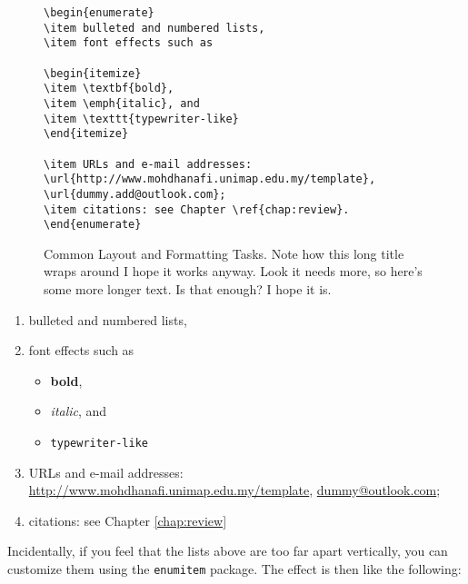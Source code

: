 
\begin{figure}[htb!]
\begin{lstlisting}
\begin{enumerate}
\item bulleted and numbered lists, 
\item font effects such as

\begin{itemize}
\item \textbf{bold}, 
\item \emph{italic}, and 
\item \texttt{typewriter-like}
\end{itemize}

\item URLs and e-mail addresses: \url{http://www.mohdhanafi.unimap.edu.my/template}, \url{dummy.add@outlook.com};
\item citations: see Chapter \ref{chap:review}.
\end{enumerate}
\end{lstlisting}
\caption{Common Layout and Formatting Tasks. Note how this long title wraps around I hope it works anyway. Look it needs more, so here's some more longer text. Is that enough? I hope it is.}\label{fig:simple}
\end{figure}

\begin{enumerate}
\item bulleted and numbered lists, 
\item font effects such as

\begin{itemize}
\item \textbf{bold}, 
\item \emph{italic}, and 
\item \texttt{typewriter-like}
\end{itemize}

\item URLs and e-mail addresses:\\ \url{http://www.mohdhanafi.unimap.edu.my/template}, \url{dummy@outlook.com};
\item citations: see Chapter \ref{chap:review}
\end{enumerate}

Incidentally, if you feel that the lists above are too far apart vertically, you can customize them using the \texttt{enumitem} package. The effect is then like the following:


